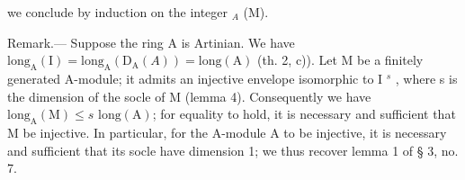 we conclude by induction on the integer \(_{A}\) (M).

Remark.--- Suppose the ring A is Artinian. We have \(\text{long}_{\text{A}}(\text{I}) = \text{long}_{\text{A}}(\text{D}_{\text{A}}(A)) = \text{long}(\text{A})\) (th. 2, c)). Let M be a finitely generated A-module; it admits an injective envelope isomorphic to I \(^{s}\) , where s is the dimension of the socle of M (lemma 4). Consequently we have \(\text{long}_{\text{A}}(\text{M}) \leqslant s \text{ long}(\text{A})\); for equality to hold, it is necessary and sufficient that M be injective. In particular, for the A-module A to be injective, it is necessary and sufficient that its socle have dimension 1; we thus recover lemma 1 of § 3, no. 7.

